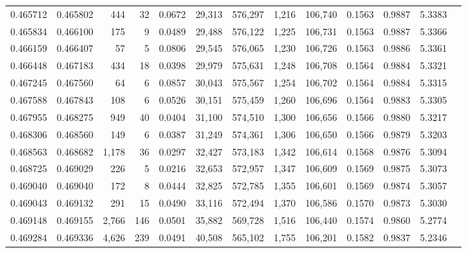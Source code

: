 \begin{tabular}{rrrrrrrrrrrrr}
0.465712 & 0.465802 &   444 &    32 &                                     0.0672 &  29,313 & 576,297 &   1,216 & 106,740 & 0.1563 & 0.9887 & 5.3383 \\
0.465834 & 0.466100 &   175 &     9 &                                     0.0489 &  29,488 & 576,122 &   1,225 & 106,731 & 0.1563 & 0.9887 & 5.3366 \\
0.466159 & 0.466407 &    57 &     5 &                                     0.0806 &  29,545 & 576,065 &   1,230 & 106,726 & 0.1563 & 0.9886 & 5.3361 \\
0.466448 & 0.467183 &   434 &    18 &                                     0.0398 &  29,979 & 575,631 &   1,248 & 106,708 & 0.1564 & 0.9884 & 5.3321 \\
0.467245 & 0.467560 &    64 &     6 &                                     0.0857 &  30,043 & 575,567 &   1,254 & 106,702 & 0.1564 & 0.9884 & 5.3315 \\
0.467588 & 0.467843 &   108 &     6 &                                     0.0526 &  30,151 & 575,459 &   1,260 & 106,696 & 0.1564 & 0.9883 & 5.3305 \\
0.467955 & 0.468275 &   949 &    40 &                                     0.0404 &  31,100 & 574,510 &   1,300 & 106,656 & 0.1566 & 0.9880 & 5.3217 \\
0.468306 & 0.468560 &   149 &     6 &                                     0.0387 &  31,249 & 574,361 &   1,306 & 106,650 & 0.1566 & 0.9879 & 5.3203 \\
0.468563 & 0.468682 & 1,178 &    36 &                                     0.0297 &  32,427 & 573,183 &   1,342 & 106,614 & 0.1568 & 0.9876 & 5.3094 \\
0.468725 & 0.469029 &   226 &     5 &                                     0.0216 &  32,653 & 572,957 &   1,347 & 106,609 & 0.1569 & 0.9875 & 5.3073 \\
0.469040 & 0.469040 &   172 &     8 &                                     0.0444 &  32,825 & 572,785 &   1,355 & 106,601 & 0.1569 & 0.9874 & 5.3057 \\
0.469043 & 0.469132 &   291 &    15 &                                     0.0490 &  33,116 & 572,494 &   1,370 & 106,586 & 0.1570 & 0.9873 & 5.3030 \\
0.469148 & 0.469155 & 2,766 &   146 &                                     0.0501 &  35,882 & 569,728 &   1,516 & 106,440 & 0.1574 & 0.9860 & 5.2774 \\
0.469284 & 0.469336 & 4,626 &   239 &                                     0.0491 &  40,508 & 565,102 &   1,755 & 106,201 & 0.1582 & 0.9837 & 5.2346 \\

\end{tabular}

